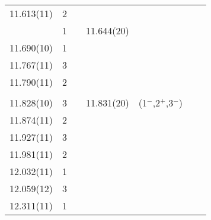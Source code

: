 \begin{center}
\begin{longtable}{cc c cc cc}
     11.613(11)     &   2   &       &       &       &       &       \\
    &   1   &       &     11.644(20)    &                           &       &       \\
   11.690(10)       &   1   &       &       &       &       &       \\
   11.767(11)       &   3   &       &       &       &       &       \\
   11.790(11)       &   2   &       &       &       &       &       \\
    &       &       &       &       &       &       \\
   11.828(10)       &   3   &       &     11.831(20)    &    (1$^-$,2$^+$,3$^-$)    &       &       \\
     11.874(11)     &   2   &       &       &       &       &       \\
    11.927(11)      &   3   &       &       &       &       &       \\
    11.981(11)      &   2   &       &       &       &       &       \\
     12.032(11)     &   1   &       &       &       &       &       \\
     12.059(12)     &   3   &       &       &       &       &       \\
    12.311(11)      &   1   &       &       &       &       &       \\


    \end{longtable}
\end{center}


